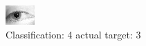 \begin{figure}[h!]
\begin{center}
\includegraphics[width=0.60\columnwidth]{figures/ID1316_class_4_target_3.png}
\end{center}
\caption{ Classification: 4 actual target: 3}
\label{fig:ID1316_class_4_target_3}
\end{figure}
